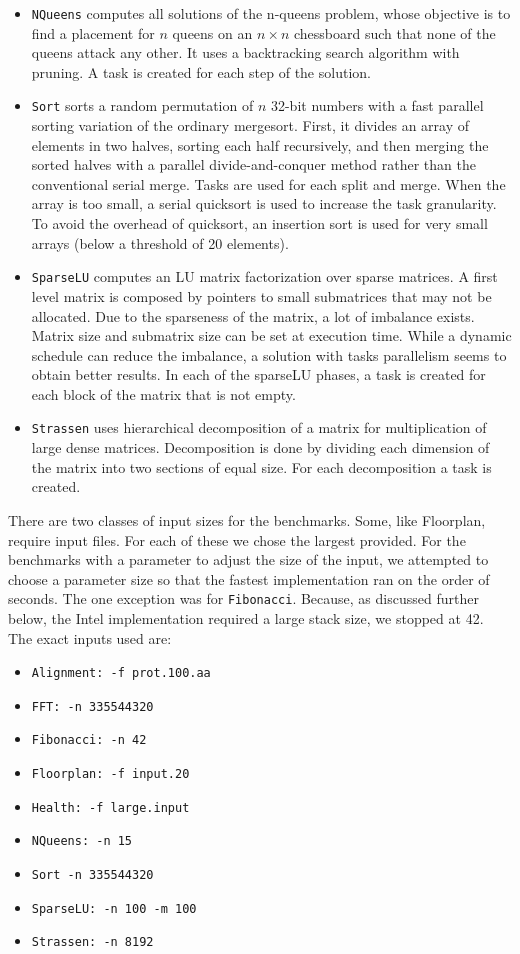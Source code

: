 \documentclass[sigconf]{acmart}
\begin{document}
\begin{itemize}
\item \texttt{NQueens} computes  all  solutions  of  the n-queens
problem, whose objective is to find a placement for $n$ queens on an $n
\times n$ chessboard such that none of the queens attack any other. It uses
a backtracking search algorithm with pruning. A task is created for each step
of the solution.
\item \texttt{Sort} sorts a random permutation of $n$ 32-bit numbers with  a
fast  parallel  sorting  variation of  the  ordinary mergesort.  First, it
divides an array of elements in two halves, sorting  each half  recursively,
and  then  merging  the  sorted halves with a parallel divide-and-conquer
method rather than the  conventional  serial  merge.  Tasks are  used  for
each  split and merge. When the array is too small, a serial quicksort is used
to increase  the  task  granularity.  To  avoid  the overhead of  quicksort, an
insertion  sort  is  used  for  very  small  arrays (below a threshold of 20
elements).
\item \texttt{SparseLU} computes an LU matrix factorization over
sparse matrices. A first level matrix is composed by pointers to  small
submatrices  that  may  not  be  allocated.  Due  to  the sparseness  of  the
matrix,  a  lot  of  imbalance  exists.  Matrix size and submatrix size can be
set at execution time. While a dynamic schedule can reduce the imbalance, a
solution with tasks parallelism seems to obtain better results. In each
of the sparseLU  phases,  a  task  is  created  for  each  block  of  the
matrix that is not empty.
\item \texttt{Strassen} uses  hierarchical  decomposition of a
matrix for multiplication of large dense matrices. Decomposition is done by
dividing each dimension of the matrix into  two  sections  of  equal size. For
each decomposition a task is created.
\end{itemize}

There are two classes of input sizes for the benchmarks. Some, like Floorplan,
require input files. For each of these we chose the largest provided. For the
benchmarks with a parameter to adjust the size of the input, we attempted to
choose a parameter size so that the fastest implementation ran on the order of
seconds. The one exception was for \texttt{Fibonacci}. Because, as discussed
further below, the Intel implementation required a large stack size, we stopped at
42. The exact inputs used are:

\begin{itemize}
\item \texttt{Alignment: -f prot.100.aa}
\item \texttt{FFT: -n 335544320}
\item \texttt{Fibonacci: -n 42}
\item \texttt{Floorplan: -f input.20}
\item \texttt{Health: -f large.input}
\item \texttt{NQueens: -n 15}
\item \texttt{Sort -n 335544320}
\item \texttt{SparseLU: -n 100 -m 100}
\item \texttt{Strassen: -n 8192}
\end{itemize}
\end{document}
